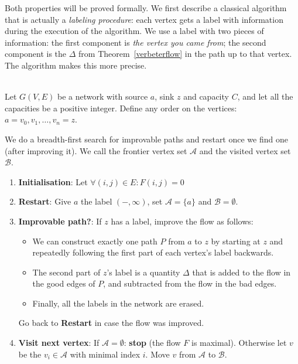 Both properties will be proved formally. We first describe a classical
algorithm that is actually a {\em labeling procedure}: each vertex
gets a label with information during the execution of the algorithm.
We use a label with two pieces of information: the first component is
{\em the vertex you came from}; the second component is the $\Delta$
from Theorem~\ref{verbeterflow} in the path up to that vertex. The
algorithm makes this more precise.

\begin{code}\label{maxflow}~\\
Let $G(V,E)$ be a network with source $a$, sink $z$ and capacity $C$,
and let all the capacities be a positive integer. Define any order on
the vertices: $a = v_{0}, v_{1}, \ldots, v_{n} = z$.

We do a breadth-first search for improvable paths and restart once we find one (after improving it). We call the frontier vertex set $\mathcal{A}$ and the visited vertex set $\mathcal{B}$.

\begin{enumerate}
	\item \textbf{Initialisation}: Let $\forall (i,j) \in E: F(i,j) = 0$
	
	\item \textbf{Restart}: Give $a$ the label $(-,\infty)$, set $\mathcal{A} = \{a\}$ and $\mathcal{B} = \emptyset$.
	
	\item \textbf{Improvable path?}: If $z$ has a label, improve the flow as follows:
	\begin{itemize}
		\item We can construct exactly one path $P$ from
	$a$ to $z$ by starting at $z$
	and repeatedly following the first part of each vertex's label backwards.
		\item The second part of $z$'s label is a quantity $\Delta$
	that is added to the flow in the good edges of $P$, and subtracted
	from the flow in the bad edges.
		\item Finally, all the labels in the network are erased.
	\end{itemize}
	Go back to \textbf{Restart} in case the flow was improved.
	
	\item \textbf{Visit next vertex}: If $\mathcal{A} = \emptyset$: \textbf{stop} (the flow $F$ is maximal).
	Otherwise let $v$ be the $v_{i} \in \mathcal{A}$ with minimal
	index $i$. Move $v$ from $\mathcal{A}$ to $\mathcal{B}$.
	

\end{enumerate}
\end{code}
